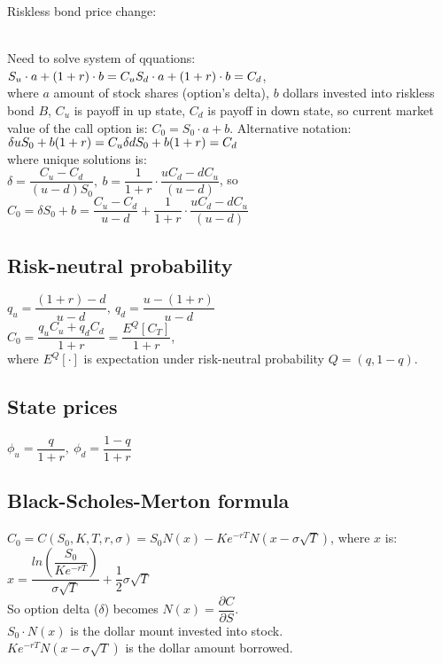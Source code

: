 Riskless bond price change:\\
\\
Need to solve system of qquations:\\
$S_u\cdot a + (1+r)\cdot b = C_u \\ S_d\cdot a + (1+r)\cdot b = C_d$, \\
where $a$ amount of stock shares (option's delta), $b$ dollars invested into riskless bond $B$, $C_u$ is payoff in up state, $C_d$ is payoff in down state, so current market value of the call option is: $C_0 = S_0\cdot a + b$.
Alternative notation: \\
$\delta uS_0 + b(1+r) = C_u \\ \delta dS_0 + b(1+r) = C_d$\\
where unique solutions is:\\
$\delta = \dfrac{C_u-C_d}{(u -d)S_0},\ b=\dfrac{1}{1+r}\cdot\dfrac{uC_d - dC_u}{(u-d)}$, so\\
$C_0 = \delta S_0 + b = \dfrac{C_u-C_d}{u -d} + \dfrac{1}{1+r}\cdot\dfrac{uC_d - dC_u}{(u-d)}$\\
\subsection*{Risk-neutral probability}
$q_u = \dfrac{(1+r) -d}{u-d},\ q_d=\dfrac{u-(1+r)}{u-d}$\\
$C_0=\dfrac{q_uC_u + q_dC_d}{1+r} = \dfrac{E^Q[C_T]}{1+r}$,\\ where
$E^Q[\cdot]$ is expectation under risk-neutral probability $Q = (q, 1-q)$.
\subsection*{State prices}
$\phi_u=\dfrac{q}{1+r},\ \phi_d=\dfrac{1-q}{1+r}$
\subsection*{Black-Scholes-Merton formula}
$C_0=C(S_0,K,T,r,\sigma) = S_0N(x) - Ke^{-rT}N(x-\sigma\sqrt{T})$, where $x$ is: $x=\dfrac{ln\left(\dfrac{S_0}{Ke^{-rT}}\right)}{\sigma\sqrt{T}} + \dfrac{1}{2}\sigma\sqrt{T}$\\
So option delta ($\delta$) becomes $N(x) = \dfrac{\partial C}{\partial S}$.\\
$S_0\cdot N(x)$ is the dollar mount invested into stock.\\
$Ke^{-rT}N(x-\sigma\sqrt{T})$ is the dollar amount borrowed.

